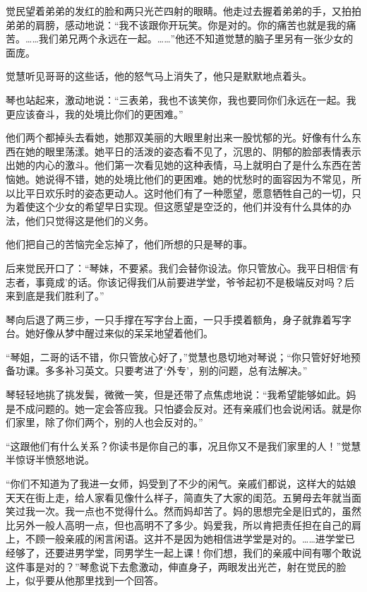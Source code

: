 \par 觉民望着弟弟的发红的脸和两只光芒四射的眼睛。他走过去握着弟弟的手，又拍拍弟弟的肩膀，感动地说：“我不该跟你开玩笑。你是对的。你的痛苦也就是我的痛苦。……我们弟兄两个永远在一起。……”他还不知道觉慧的脑子里另有一张少女的面庞。
\par 觉慧听见哥哥的这些话，他的怒气马上消失了，他只是默默地点着头。
\par 琴也站起来，激动地说：“三表弟，我也不该笑你，我也要同你们永远在一起。我更应该奋斗，我的处境比你们的更困难。”
\par 他们两个都掉头去看她，她那双美丽的大眼里射出来一股忧郁的光。好像有什么东西在她的眼里荡漾。她平日的活泼的姿态看不见了，沉思的、阴郁的脸部表情表示出她的内心的激斗。他们第一次看见她的这种表情，马上就明白了是什么东西在苦恼她。她说得不错，她的处境比他们的更困难。她的忧愁时的面容因为不常见，所以比平日欢乐时的姿态更动人。这时他们有了一种愿望，愿意牺牲自己的一切，只为着使这个少女的希望早日实现。但这愿望是空泛的，他们并没有什么具体的办法，他们只觉得这是他们的义务。
\par 他们把自己的苦恼完全忘掉了，他们所想的只是琴的事。
\par 后来觉民开口了：“琴妹，不要紧。我们会替你设法。你只管放心。我平日相信‘有志者，事竟成’的话。你该记得我们从前要进学堂，爷爷起初不是极端反对吗？后来到底是我们胜利了。”
\par 琴向后退了两三步，一只手撑在写字台上面，一只手摸着额角，身子就靠着写字台。她好像从梦中醒过来似的呆呆地望着他们。
\par “琴姐，二哥的话不错，你只管放心好了，”觉慧也恳切地对琴说；“你只管好好地预备功课。多多补习英文。只要考进了‘外专’，别的问题，总有法解决。”
\par 琴轻轻地挑了挑发鬓，微微一笑，但是还带了点焦虑地说：“我希望能够如此。妈是不成问题的。她一定会答应我。只怕婆会反对。还有亲戚们也会说闲话。就是你们家里，除了你们两个，别的人也会反对的。”
\par “这跟他们有什么关系？你读书是你自己的事，况且你又不是我们家里的人！”觉慧半惊讶半愤怒地说。
\par “你们不知道为了我进一女师，妈受到了不少的闲气。亲戚们都说，这样大的姑娘天天在街上走，给人家看见像什么样子，简直失了大家的闺范。五舅母去年就当面笑过我一次。我一点也不觉得什么。然而妈却苦了。妈的思想完全是旧式的，虽然比另外一般人高明一点，但也高明不了多少。妈爱我，所以肯把责任担在自己的肩上，不顾一般亲戚的闲言闲语。这并不是因为她相信进学堂是对的。……进学堂已经够了，还要进男学堂，同男学生一起上课！你们想，我们的亲戚中间有哪个敢说这件事是对的？”琴愈说下去愈激动，伸直身子，两眼发出光芒，射在觉民的脸上，似乎要从他那里找到一个回答。
